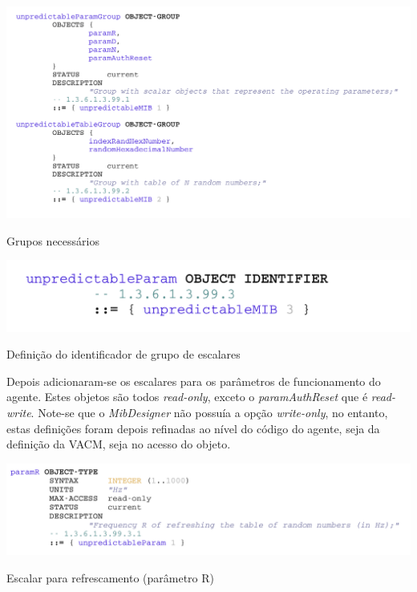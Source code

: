 \begin{center}
 	
 	\includegraphics[width=\textwidth,height=\textheight,keepaspectratio]{resources/images/faseA/mib/groups.png}
 	\captionsetup{type=figure, width=0.8\linewidth}
	\caption{Grupos necessários}
\label{fig:fasea:groups} 
\end{center}

\newpage

\begin{center}
 	
 	\includegraphics[width=\textwidth,height=\textheight,keepaspectratio]{resources/images/faseA/mib/scalars/groupid.png}
 	\captionsetup{type=figure, width=0.8\linewidth}
	\caption{Definição do identificador de grupo de escalares}
\label{fig:fasea:groupid} 
\end{center}

Depois adicionaram-se os escalares para os parâmetros de funcionamento do
agente. Estes objetos são todos \emph{read-only}, exceto o \emph{paramAuthReset}
que é \emph{read-write}. Note-se que o \emph{MibDesigner} não possuía a opção
\emph{write-only}, no entanto, estas definições foram depois refinadas ao nível
do código do agente, seja da definição da VACM, seja no acesso do objeto.


\begin{center}
 	
 	\includegraphics[width=\textwidth,height=\textheight,keepaspectratio]{resources/images/faseA/mib/scalars/paramR.png}
 	\captionsetup{type=figure, width=0.8\linewidth}
	\caption{Escalar para refrescamento (parâmetro R)}
\label{fig:fasea:} 
\end{center}

